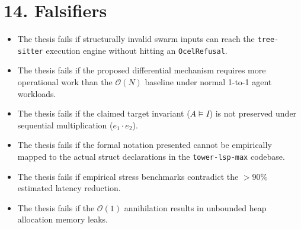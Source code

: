 \section{14. Falsifiers}
\begin{itemize}
    \item The thesis fails if structurally invalid swarm inputs can reach the \texttt{tree-sitter} execution engine without hitting an \texttt{OcelRefusal}.
    \item The thesis fails if the proposed differential mechanism requires more operational work than the $\mathcal{O}(N)$ baseline under normal 1-to-1 agent workloads.
    \item The thesis fails if the claimed target invariant ($A \models I$) is not preserved under sequential multiplication ($e_1 \cdot e_2$).
    \item The thesis fails if the formal notation presented cannot be empirically mapped to the actual struct declarations in the \texttt{tower-lsp-max} codebase.
    \item The thesis fails if empirical stress benchmarks contradict the $>90\%$ estimated latency reduction.
    \item The thesis fails if the $\mathcal{O}(1)$ annihilation results in unbounded heap allocation memory leaks.
\end{itemize}

